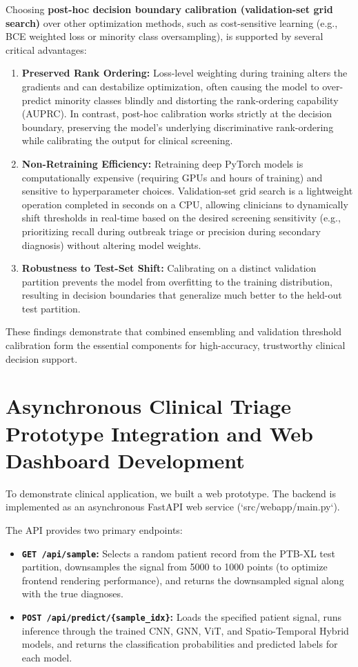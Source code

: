 \documentclass[12pt,a4paper]{report}
\begin{document}
Choosing \textbf{post-hoc decision boundary calibration (validation-set grid search)} over other optimization methods, such as cost-sensitive learning (e.g., BCE weighted loss or minority class oversampling), is supported by several critical advantages:
\begin{enumerate}
    \item \textbf{Preserved Rank Ordering:} Loss-level weighting during training alters the gradients and can destabilize optimization, often causing the model to over-predict minority classes blindly and distorting the rank-ordering capability (AUPRC). In contrast, post-hoc calibration works strictly at the decision boundary, preserving the model's underlying discriminative rank-ordering while calibrating the output for clinical screening.
    \item \textbf{Non-Retraining Efficiency:} Retraining deep PyTorch models is computationally expensive (requiring GPUs and hours of training) and sensitive to hyperparameter choices. Validation-set grid search is a lightweight operation completed in seconds on a CPU, allowing clinicians to dynamically shift thresholds in real-time based on the desired screening sensitivity (e.g., prioritizing recall during outbreak triage or precision during secondary diagnosis) without altering model weights.
    \item \textbf{Robustness to Test-Set Shift:} Calibrating on a distinct validation partition prevents the model from overfitting to the training distribution, resulting in decision boundaries that generalize much better to the held-out test partition.
\end{enumerate}
These findings demonstrate that combined ensembling and validation threshold calibration form the essential components for high-accuracy, trustworthy clinical decision support.

\section{Asynchronous Clinical Triage Prototype Integration and Web Dashboard Development}
To demonstrate clinical application, we built a web prototype. The backend is implemented as an asynchronous FastAPI web service (`src/webapp/main.py`).

The API provides two primary endpoints:
\begin{itemize}
    \item \textbf{\texttt{GET /api/sample}:} Selects a random patient record from the PTB-XL test partition, downsamples the signal from 5000 to 1000 points (to optimize frontend rendering performance), and returns the downsampled signal along with the true diagnoses.
    \item \textbf{\texttt{POST /api/predict/\{sample\_idx\}}:} Loads the specified patient signal, runs inference through the trained CNN, GNN, ViT, and Spatio-Temporal Hybrid models, and returns the classification probabilities and predicted labels for each model.
\end{itemize}
\end{document}
